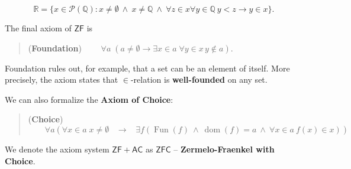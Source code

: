 \documentclass{article}
\newcommand{\ZF}{\mathsf{ZF}}
\newcommand{\Op}[1]{\operatorname{#1}}
\newcommand{\Rat}{\mathbb{Q}}
\newcommand{\Real}{\mathbb{R}}
\newcommand{\AC}{\mathsf{AC}}
\newcommand{\ZFC}{\mathsf{ZFC}}
\begin{document}
\begin{equation}
\Real = \{ x \in \mathcal{P}(\Rat) \colon x \neq \emptyset \: \wedge \: x \neq \Rat \: \wedge \: \forall z \in x \forall y \in \Rat \: y < z \to y \in x \}.
\end{equation}

The final axiom of $\ZF$ is

\begin{quote}
(\textbf{Foundation}) $\qquad \forall a \;( a \neq \emptyset \to \exists x \in a \; \forall y \in x \, y \not \in a)$.
\end{quote}

Foundation rules out, for example, that a set can be an element of itself. More precisely, the axiom states that $\in$-relation is \textbf{well-founded} on any set.

We can also formalize the \textbf{Axiom of Choice}:

\begin{quote}
(\textbf{Choice}) $\qquad \forall a ( \forall x \in a \; x \neq \emptyset \;\;\; \to \;\;\; \exists f (\Op{Fun}(f) \:\wedge\: \Op{dom}(f) = a \:\wedge\: \forall x \in a \: f(x) \in x))$
\end{quote}

We denote the axiom system $\ZF + \AC$ as $\ZFC$ -- \textbf{Zermelo-Fraenkel with Choice}.

\clearpage

\end{document}
